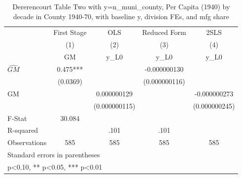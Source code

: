 \begin{table}[htbp]\centering
\def\sym#1{\ifmmode^{#1}\else\(^{#1}\)\fi}
\caption{Dererencourt Table Two with y=n\_muni\_county, Per Capita (1940) by decade in County 1940-70, with baseline y, division FEs, and mfg share}
\begin{tabular}{l*{4}{c}}
\toprule
                    & First Stage   &         OLS   &Reduced Form   &        2SLS   \\
                    &\multicolumn{1}{c}{(1)}&\multicolumn{1}{c}{(2)}&\multicolumn{1}{c}{(3)}&\multicolumn{1}{c}{(4)}\\
                    &\multicolumn{1}{c}{GM}&\multicolumn{1}{c}{y\_L0}&\multicolumn{1}{c}{y\_L0}&\multicolumn{1}{c}{y\_L0}\\
\midrule
$\hat{GM}$          &       0.475***&               &-0.000000130   &               \\
                    &    (0.0369)   &               &(0.000000116)   &               \\
\addlinespace
GM                  &               & 0.000000129   &               &-0.000000273   \\
                    &               &(0.000000115)   &               &(0.000000245)   \\
\midrule
F-Stat              &      30.084   &               &               &               \\
R-squared           &               &        .101   &        .101   &               \\
Observations        &         585   &         585   &         585   &         585   \\
\bottomrule
\multicolumn{5}{l}{\footnotesize Standard errors in parentheses}\\
\multicolumn{5}{l}{\footnotesize * p<0.10, ** p<0.05, *** p<0.01}\\
\end{tabular}
\end{table}
